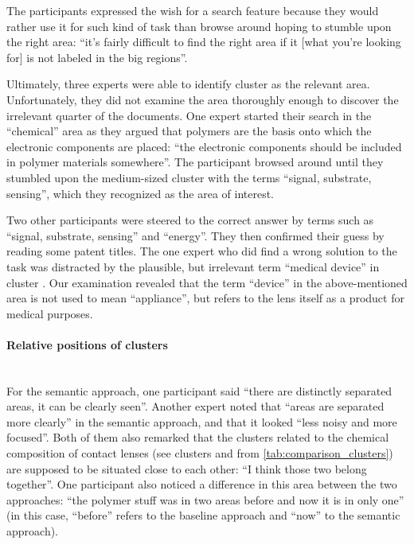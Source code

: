 The participants expressed the wish for a search feature because they would rather use it for such kind of task than browse around hoping to stumble upon the right area: ``it's fairly difficult to find the right area if it [what you're looking for] is not labeled in the big regions''.

Ultimately, three experts were able to identify cluster  as the relevant area.
Unfortunately, they did not examine the area thoroughly enough to discover the irrelevant quarter of the documents.
One expert started their search in the ``chemical'' area as they argued that polymers are the basis onto which the electronic components are placed: ``the electronic components should be included in polymer materials somewhere''.
The participant browsed around until they stumbled upon the medium-sized cluster with the terms ``signal, substrate, sensing'', which they recognized as the area of interest.

Two other participants were steered to the correct answer by terms such as ``signal, substrate, sensing'' and ``energy''.
They then confirmed their guess by reading some patent titles.
The one expert who did find a wrong solution to the task was distracted by the plausible, but irrelevant term ``medical device'' in cluster .
Our examination revealed that the term ``device'' in the above-mentioned area is not used to mean ``appliance'', but refers to the lens itself as a product for medical purposes.


\paragraph{Relative positions of clusters}~\\
For the semantic approach, one participant said ``there are distinctly separated areas, it can be clearly seen''.
Another expert noted that ``areas are separated more clearly'' in the semantic approach, and that it looked ``less noisy and more focused''.
Both of them also remarked that the clusters related to the chemical composition of contact lenses (see clusters  and  from \autoref{tab:comparison_clusters}) are supposed to be situated close to each other: ``I think those two belong together''.
One participant also noticed a difference in this area between the two approaches: ``the polymer stuff was in two areas before and now it is in only one'' (in this case, ``before'' refers to the baseline approach and ``now''  to the semantic approach).

